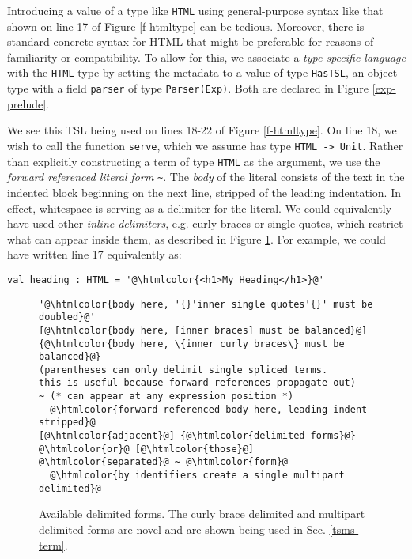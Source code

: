 \documentclass{sig-alternate}[10pt]
\newcommand{\htmlcolor}[1]{\textcolor[HTML]{339933}{#1}}
\newcommand{\mycaption}[1]{\vspace{-4px}\caption{#1}\vspace{-2px}}
\begin{document}
Introducing a value of a type like \verb|HTML| using general-purpose syntax like that shown on line 17 of Figure \ref{f-htmltype} can be tedious. Moreover, there is standard concrete syntax for HTML that might be preferable for reasons of familiarity or compatibility. To allow for this, we associate a \emph{type-specific language} with the \verb|HTML| type by setting the metadata to a value of type \verb|HasTSL|, an object type with a field \verb|parser| of type \verb|Parser(Exp)|. Both are declared  in Figure \ref{exp-prelude}.

We see this TSL being used on lines 18-22 of Figure \ref{f-htmltype}. On line 18, we wish to call the function \verb|serve|, which we assume has type \verb|HTML -> Unit|. Rather than explicitly constructing a term of type \verb|HTML| as the argument, we use the \emph{forward referenced literal form} \lstinline[style=wyvern]{~}. The \emph{body} of the literal consists of the text in the indented block beginning on the next line, stripped of the leading indentation. In effect, whitespace is serving as a delimiter for the literal. We could equivalently have used other \emph{inline delimiters}, e.g. curly braces or single quotes, which restrict what can appear inside them, as described in Figure \ref{f-delimited}. For example, we could have written line 17 equivalently as:
\vspace{-3px}\begin{lstlisting}[style=wyvern, numbers=none, frame=none]
  val heading : HTML = '@\htmlcolor{<h1>My Heading</h1>}@'
\end{lstlisting}\vspace{-4px}

\begin{figure}[t]
\begin{lstlisting}[style=tempwyvern]
'@\htmlcolor{body here, '{}'inner single quotes'{}' must be doubled}@'
[@\htmlcolor{body here, [inner braces] must be balanced}@]
{@\htmlcolor{body here, \{inner curly braces\} must be balanced}@}
(parentheses can only delimit single spliced terms. 
this is useful because forward references propagate out)
~ (* can appear at any expression position *)
  @\htmlcolor{forward referenced body here, leading indent stripped}@
[@\htmlcolor{adjacent}@] {@\htmlcolor{delimited forms}@} @\htmlcolor{or}@ [@\htmlcolor{those}@] @\htmlcolor{separated}@ ~ @\htmlcolor{form}@
  @\htmlcolor{by identifiers create a single multipart delimited}@
\end{lstlisting}
\mycaption{Available delimited forms. The curly brace delimited and multipart delimited forms are novel and are shown being used in Sec. \ref{tsms-term}. }
\label{f-delimited}
\end{figure}
\end{document}
